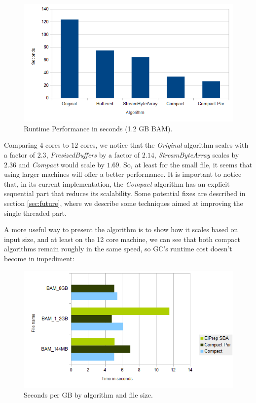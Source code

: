 \documentclass[a4paper,twoside]{article}
\begin{document}
\begin{figure}[!h]
	\centering
	\includegraphics[scale=0.45]{images/runtime_perf_1_2G.png}
	 \caption{Runtime Performance in seconds (1.2 GB BAM).}
\end{figure}

Comparing $4$ cores to $12$ cores, we notice that the {\textit{Original} } algorithm scales with a factor of $2.3$, {\textit{PresizedBuffers} } by a factor of $2.14$, {\textit{StreamByteArray} } scales by $2.36$ and {\textit{Compact} } would scale by $1.69$. So, at least for the small file, it seems that using larger machines will offer a better performance. It is important to notice that, in its current implementation, the {\textit{Compact} } algorithm has an explicit sequential part that reduces its scalability.
Some potential fixes are described in section \ref{sec:future}, where we describe some techniques aimed at improving the single threaded part.

A more useful way to present the algorithm is to show how it scales based on input size, and at least on the 12 core machine, we can see that both compact algorithms remain roughly in the same speed, so GC's runtime cost doesn't become in impediment:

\begin{figure}[!h]
	\centering
	\includegraphics[scale=0.4]{images/seconds_per_gb_ryzen.png}
	\caption{Seconds per GB by algorithm and file size.}
\end{figure}
\end{document}
